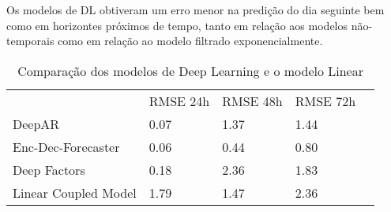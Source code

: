 Os modelos de DL obtiveram um erro menor na predição do dia seguinte bem como em
horizontes próximos de tempo, tanto em relação aos modelos não-temporais como em
relação ao modelo filtrado exponencialmente.

\begin{center}
  \begin{table}[htbp]
    \caption{Comparação dos modelos de Deep Learning e o modelo Linear}
    \centering
  \begin{tabular}{l|llll}
    \cline{2-4}
    & \multicolumn{1}{l|}{RMSE 24h} & \multicolumn{1}{l|}{RMSE 48h} & \multicolumn{1}{l|}{RMSE 72h} &  \\ \cline{1-4}
    \multicolumn{1}{|l|}{DeepAR}               &               0.07                &          1.37                     &           1.44                    &  \\ \cline{1-1}
    \multicolumn{1}{|l|}{Enc-Dec-Forecaster}   &                   0.06            &        0.44                       &       0.80                        &  \\ \cline{1-1}
    \multicolumn{1}{|l|}{Deep Factors}         &              0.18                 &           2.36                    &                   1.83            &  \\ \cline{1-1}
    \multicolumn{1}{|l|}{Linear Coupled Model} &                  1.79             &       1.47                        &     2.36                          &  \\ \cline{1-1}
  \end{tabular}
  \end{table}
\end{center}
